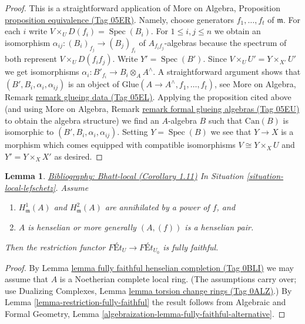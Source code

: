 \documentclass{amsart}
\newenvironment{reference}{\comment}{\endcomment}
\theoremstyle{plain}
\newtheorem{lemma}[subsection]{Lemma}
\theoremstyle{definition}
\theoremstyle{remark}
\numberwithin{equation}{subsection}
\def\Spec{\mathop{\mathrm{Spec}}}
\begin{document}
\begin{proof}
This is a straightforward application of
More on Algebra, Proposition \href{https://stacks.math.columbia.edu/tag/05ER}{proposition equivalence (Tag 05ER)}.
Namely, choose generators $f_1, \ldots, f_t$ of $\mathfrak m$.
For each $i$ write $V \times_U D(f_i) = \Spec(B_i)$.
For $1 \leq i, j \leq n$ we obtain an isomorphism
$\alpha_{ij} : (B_i)_{f_j} \to (B_j)_{f_i}$ of $A_{f_if_j}$-algebras
because the spectrum of both represent $V \times_U D(f_if_j)$.
Write $Y' = \Spec(B')$. Since $V \times_U U' = Y \times_{X'} U'$
we get isomorphisms $\alpha_i : B'_{f_i} \to B_i \otimes_A A^\wedge$.
A straightforward argument shows that $(B', B_i, \alpha_i, \alpha_{ij})$
is an object of $\text{Glue}(A \to A^\wedge, f_1, \ldots, f_t)$, see
More on Algebra, Remark \href{https://stacks.math.columbia.edu/tag/05EL}{remark glueing data (Tag 05EL)}.
Applying the proposition cited above (and using
More on Algebra, Remark \href{https://stacks.math.columbia.edu/tag/05EU}{remark formal glueing algebras (Tag 05EU)}
to obtain the algebra structure) we find an $A$-algebra $B$ such that
$\text{Can}(B)$ is isomorphic to $(B', B_i, \alpha_i, \alpha_{ij})$.
Setting $Y = \Spec(B)$ we see that $Y \to X$ is a morphism
which comes equipped with compatible isomorphisms
$V \cong Y \times_X U$ and $Y' = Y \times_X X'$ as desired.
\end{proof}


\begin{lemma}
\label{lemma-fully-faithful-minimal}
\begin{reference}
\href{https://stacks.math.columbia.edu/bibliography}{Bibliography: Bhatt-local (Corollary 1.11)}
\end{reference}
In Situation \ref{situation-local-lefschetz}. Assume
\begin{enumerate}
\item $H^1_\mathfrak m(A)$ and $H^2_\mathfrak m(A)$ are
annihilated by a power of $f$, and
\item $A$ is henselian or more generally $(A, (f))$ is a henselian pair.
\end{enumerate}
Then the restriction functor
$\textit{F\'Et}_U \longrightarrow \textit{F\'Et}_{U_0}$
is fully faithful.
\end{lemma}

\begin{proof}
By Lemma \href{https://stacks.math.columbia.edu/tag/0BLI}{lemma fully faithful henselian completion (Tag 0BLI)}
we may assume that $A$ is a Noetherian complete local ring.
(The assumptions carry over; use
Dualizing Complexes, Lemma \href{https://stacks.math.columbia.edu/tag/0ALZ}{lemma torsion change rings (Tag 0ALZ)}.)
By Lemma \ref{lemma-restriction-fully-faithful}
the result follows from
Algebraic and Formal Geometry, Lemma
\ref{algebraization-lemma-fully-faithful-alternative}.
\end{proof}
\end{document}
